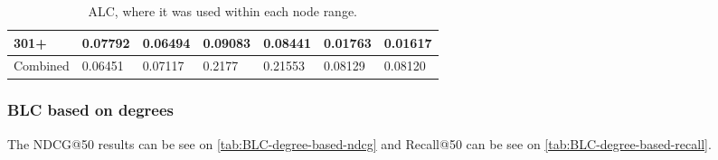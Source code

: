\begin{table*}[h!]
\begin{tabular}{|l|l|l||l|l||l|l|}
        301+      & 0.07792                                 & 0.06494                        & 0.09083                          & 0.08441          & 0.01763       & 0.01617          \\ \hline
        Combined  & 0.06451                                 & 0.07117                        & 0.2177                           & 0.21553          & 0.08129       & 0.08120          \\ \hline
    \end{tabular}
    \caption{ALC, where it was used within each node range.}
    \label{tab:ALC-degree-based-recall}
\end{table*}

\subsubsection{BLC based on degrees}
The NDCG@50 results can be see on \autoref{tab:BLC-degree-based-ndcg} and Recall@50 can be see on \autoref{tab:BLC-degree-based-recall}.

